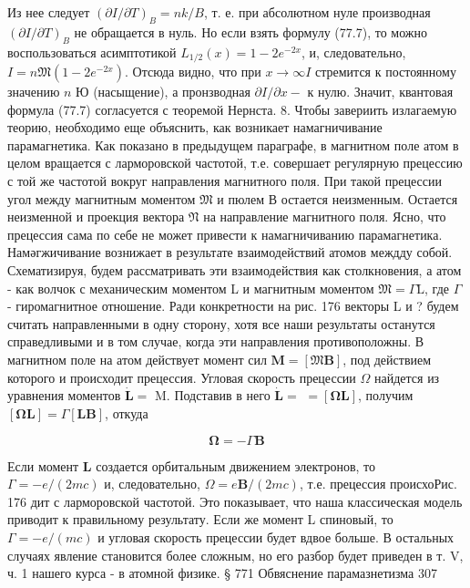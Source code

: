 \documentclass[12pt]{article}
\begin{document}
  Из нее следует $(\partial I / \partial T)_B=n k / B$, т. е. при абсолютном нуле производная $(\partial I / \partial T)_B$ не обращается в нуль. Но если взять формулу (77.7), то можно воспользоваться асимптотикой $L_{1 / 2}(x)=1-2 e^{-2 x}$, и, следовательно, $I=n \mathfrak{M}\left(1-2 e^{-2 x}\right)$. Отсюда видно, что при $x \rightarrow \infty I$ стремится к постоянному значению $n$ Ю (насыщение), а пронзводная $\partial I / \partial x-$ к нулю. Значит, квантовая формула (77.7) согласуется с теоремой Нернста.
  8. Чтобы завериить излагаемую теорию, необходимо еще объяснить, как возникает намагничивание парамагнетика. Как показано в предыдущем параграфе, в магнитном поле атом в целом вращается с ларморовской частотой, т.е. совершает регулярную прецессию с той же частотой вокруг направления магнитного поля. При такой прецессии угол между магнитным моментом $\mathfrak{M}$ и пюлем В остается неизменным. Остается неизменной и проекция вектора $\mathfrak{N}$ на направление магнитного поля. Ясно, что прецессия сама по себе не может привести к намагничиванию парамагнетика. Намәгжичивание вознижает в результате взаимодействий атомов междду собой. Схематизируя, будем рассматривать эти взаимодействия как столкновения, а атом - как волчок с механическим моментом L и магнитным моментом $\mathfrak{M}=\Gamma \mathrm{L}$, где $\Gamma$ - гиромагнитное отношение. Ради конкретности на рис. 176 векторы L и ? будем считать направленными в одну сторону, хотя все наши результаты останутся справедливыми и в том случае, когда эти направления противоположны. В магнитном поле на атом действует момент сил $\mathbf{M}=[\mathfrak{M} \mathbf{B}]$, под действием которого и происходит прецессия. Угловая скорость прецессии $\Omega$ найдется из уравнения моментов $\dot{\mathbf{L}}=$ M. Подставив в него $\dot{\mathbf{L}}=$ $=[\boldsymbol{\Omega L}]$, получим $[\boldsymbol{\Omega L}]=\Gamma[\mathbf{L B}]$, откуда

  \begin{equation}
    \boldsymbol{\Omega} = -\Gamma\mathbf{B}
  \end{equation}

  Если момент $\mathbf{L}$ создается орбитальным движением электронов, то $\Gamma=-e /(2 m c)$ и, следовательно, $\Omega=e \mathbf{B} /(2 m c)$, т.е. прецессия происхоРис. 176 дит с ларморовской частотой. Это показывает, что наша классическая модель приводит к правильному результату. Если же момент L спиновый, то $\Gamma=-e /(m c)$ и угловая скорость прецессии будет вдвое больше. В остальных случаях явление становится более сложным, но его разбор будет приведен в т. V, ч. 1 нашего курса - в атомной физике.
  § 771
  Обвяснение парамазнетизма
  307
\end{document}
